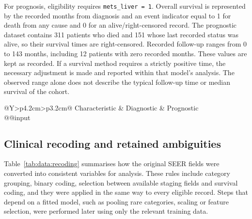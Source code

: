 For prognosis, eligibility requires \texttt{mets\_liver = 1}. Overall
survival is represented by the recorded months from diagnosis and an event
indicator equal to 1 for death from any cause and 0 for an alive/right-censored
record. The prognostic dataset contains 311 patients who died and 151 whose last
recorded status was alive, so their survival times are right-censored. Recorded
follow-up ranges from 0 to 143 months, including 12 patients with zero recorded
months. These values are kept as recorded. If a survival method requires a
strictly positive time, the necessary adjustment is made and reported within
that model's analysis. The observed range alone does not describe the typical
follow-up time or median survival of the cohort.

\begin{table}[htbp]
\centering\small
\caption{Selected characteristics of the diagnostic and prognostic datasets
obtained after cohort selection and preprocessing. Percentages use the
column-specific sample size. Q1--Q3 denotes the first and third age quartiles;
the prognostic cohort is a subset of the diagnostic cohort.}
\label{tab:data:cohort_summary}
\begin{tabularx}{\linewidth}{@{}Y>{\RaggedRight\arraybackslash}p{4.2cm}>{\RaggedRight\arraybackslash}p{3.2cm}@{}}
\toprule
Characteristic & Diagnostic & Prognostic \\
\midrule
\csname @@input
\bottomrule
\end{tabularx}
\end{table}

\subsection{Clinical recoding and retained ambiguities}
\label{sec:data:recoding}

Table~\ref{tab:data:recoding} summarises how the original SEER fields were
converted into consistent variables for analysis. These rules include category
grouping, binary coding, selection between available staging fields and survival
coding, and they were applied in the same way to every eligible record. Steps
that depend on a fitted model, such as pooling rare categories, scaling or
feature selection, were performed later using only the relevant training data.

